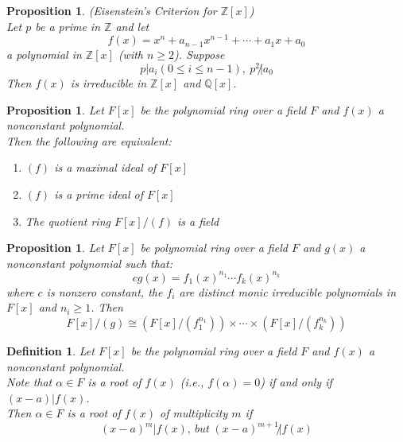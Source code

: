 \documentclass[a4paper,8pt]{article}
\newcommand{\Q}{\mathbb{Q}}
\newcommand{\Z}{\mathbb{Z}}
\newcommand{\hlt}[1]{\textit{{\color{blue}#1}}}
\theoremstyle{theorem}
\newtheorem{proposition}[theorem]{Proposition}
\newtheorem{definition}[theorem]{Definition}
\begin{document}
\begin{proposition}
\hlt{(Eisenstein's Criterion for $\Z [x]$)}\\
Let $p$ be a prime in $\Z$ and let
\begin{equation}
f(x) = x^n + a_{n-1} x^{n-1} + \cdots + a_1 x + a_0 \nonumber
\end{equation}
a polynomial in $\Z [x]$ (with $n \geq 2$). Suppose
\begin{equation}
p|a_i (0 \leq i \leq n-1), \ p^2 \not| a_0 \nonumber
\end{equation}
Then $f(x)$ is irreducible in $\Z [x]$ and $\Q [x]$.
\end{proposition}

\begin{proposition}
Let $F[x]$ be the polynomial ring over a field $F$ and $f(x)$ a nonconstant polynomial.\\
Then the following are equivalent:
\begin{enumerate}[label=(\roman*)]
\item $(f)$ is a maximal ideal of $F[x]$
\item $(f)$ is a prime ideal of $F[x]$
\item The quotient ring $F[x]/(f)$ is a field
\end{enumerate}
\end{proposition}

\begin{proposition}
Let $F[x]$ be polynomial ring over a field $F$ and $g(x)$ a nonconstant polynomial such that:
\begin{equation}
cg(x) = f_1 (x)^{n_1} \cdots f_k (x)^{n_k} \nonumber
\end{equation}
where $c$ is nonzero constant, the $f_i$ are distinct monic irreducible polynomials in $F[x]$ and $n_i \geq 1$. Then
\begin{equation}
F[x]/(g) \cong (F[x]/(f_1^{n_1})) \times \cdots \times (F[x]/(f_k^{n_k})) \nonumber
\end{equation}
\end{proposition}

\begin{definition}
Let $F[x]$ be the polynomial ring over a field $F$ and $f(x)$ a nonconstant polynomial.\\
Note that $\alpha \in F$ is a root of $f(x)$ (i.e., $f(\alpha) = 0$) if and only if $(x-a) | f(x)$.\\
Then $\alpha \in F$ is a root of $f(x)$ of \hlt{multiplicity $m$} if
\begin{equation}
(x-a)^m | f(x), \ but \ (x-a)^{m+1} \not| f(x) \nonumber
\end{equation}
\end{definition}
\end{document}
